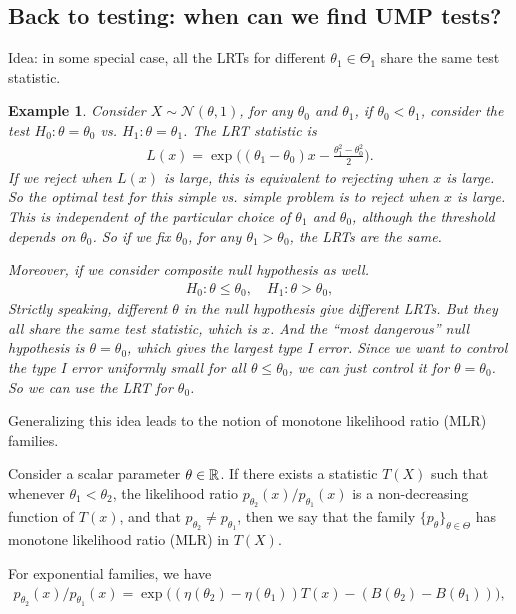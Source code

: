 \documentclass[11pt,letterpaper]{article}
\newtheorem{example}{Example}
\numberwithin{theorem}{lecture}
\numberwithin{proposition}{lecture}
\numberwithin{lemma}{lecture}
\numberwithin{claim}{lecture}
\numberwithin{corollary}{lecture}
\numberwithin{definition}{lecture}
\numberwithin{conjecture}{lecture}
\numberwithin{remark}{lecture}
\numberwithin{example}{lecture}
\numberwithin{equation}{lecture}
\begin{document}
\subsection{Back to testing: when can we find UMP tests?}
Idea: in some special case, all the LRTs for different $\theta_1 \in \Theta_1$ share the same test statistic.
\begin{example}\upshape
  Consider $X \sim \mathcal{N} (\theta, 1)$, for any $\theta_0$ and $\theta_1$, if $\theta_0 < \theta_1$, consider the test $H_0: \theta = \theta_0$ vs. $H_1: \theta = \theta_1$. The LRT statistic is
  \begin{align*}
    L (x) = \exp \Big( (\theta_1 - \theta_0) x - \frac{\theta_1^2 - \theta_0^2}{2} \big).
  \end{align*}
  If we reject when $L (x)$ is large, this is equivalent to rejecting when $x$ is large. So the optimal test for this simple vs. simple problem is to reject when $x$ is large. This is independent of the particular choice of $\theta_1$ and $\theta_0$, although the threshold depends on $\theta_0$. So if we fix $\theta_0$, for any $\theta_1 > \theta_0$, the LRTs are the same.

Moreover, if we consider composite null hypothesis as well.
\begin{align*}
  H_0: \theta \leq \theta_0, \quad H_1: \theta > \theta_0,
\end{align*}
Strictly speaking, different $\theta$ in the null hypothesis give different LRTs. But they all share the same test statistic, which is $x$. And the ``most dangerous'' null hypothesis is $\theta = \theta_0$, which gives the largest type I error. Since we want to control the type I error uniformly small for all $\theta \leq \theta_0$, we can just control it for $\theta = \theta_0$. So we can use the LRT for $\theta_0$.
\end{example}
Generalizing this idea leads to the notion of monotone likelihood ratio (MLR) families.
\begin{definition}
  Consider a scalar parameter $\theta \in \mathbb{R}$. If there exists a statistic $T (X)$ such that whenever $\theta_1 < \theta_2$, the likelihood ratio $p_{\theta_2} (x) / p_{\theta_1} (x)$ is a non-decreasing function of $T (x)$, and that $p_{\theta_2} \neq p_{\theta_1}$, then we say that the family $\{p_\theta\}_{\theta \in \Theta}$ has monotone likelihood ratio (MLR) in $T (X)$.
\end{definition}
For exponential families, we have
\begin{align*}
  p_{\theta_2} (x) / p_{\theta_1} (x) = \exp \big( (\eta (\theta_2) - \eta(\theta_1)) T (x) - (B(\theta_2) - B(\theta_1)) \big),
\end{align*}
\end{document}
